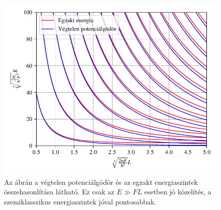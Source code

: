 	\begin{figure}[H]
		\includegraphics[scale=1]{./figs/infsquareenergia.pdf}
		\caption[Végtelen potenciálgödör energiaszintjei]{Az ábrán a végtelen potenciálgödör és az egzakt energiaszintek összehasonlítása látható. Ez csak az $E \gg FL$ esetben jó közelítés, a szemiklasszikus energiaszintek jóval pontosabbak.}
	\end{figure}

